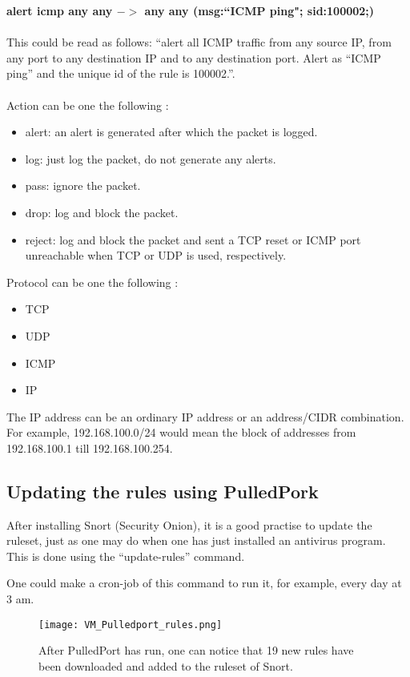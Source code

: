 \textbf{alert icmp any any $->$ any any (msg:``ICMP ping"; sid:100002;)} \\ \\
This could be read as follows: ``alert all ICMP traffic from any source IP, from any port to any destination IP and to any destination port. Alert as ``ICMP ping'' and the unique id of the rule is 100002.''. \\ \\
Action can be one the following \citep{SnortRules}:
\begin{itemize}
\item alert: an alert is generated after which the packet is logged.
\item log: just log the packet, do not generate any alerts.
\item pass: ignore the packet.
\item drop: log and block the packet.
\item reject: log and block the packet and sent a TCP reset or ICMP port unreachable when TCP or UDP is used, respectively.
\end{itemize}
Protocol can be one the following \citep{SnortRules}:
\begin{itemize}
\item TCP
\item UDP
\item ICMP
\item IP
\end{itemize}
The IP address can be an ordinary IP address or an address/CIDR combination. For example, 192.168.100.0/24 would mean the block of addresses from 192.168.100.1 till 192.168.100.254.

\newpage

\subsection{Updating the rules using PulledPork}

After installing Snort (Security Onion), it is a good practise to update the ruleset, just as one may do when one has just installed an antivirus program. This is done using the ``update-rules'' command.

One could make a cron-job of this command to run it, for example, every day at 3 am.

\begin{figure}[h]
    \centering
    \texttt{[image: VM\_Pulledport\_rules.png]}
    \caption{After PulledPort has run, one can notice that 19 new rules have been downloaded and added to the ruleset of Snort.}
\end{figure}

